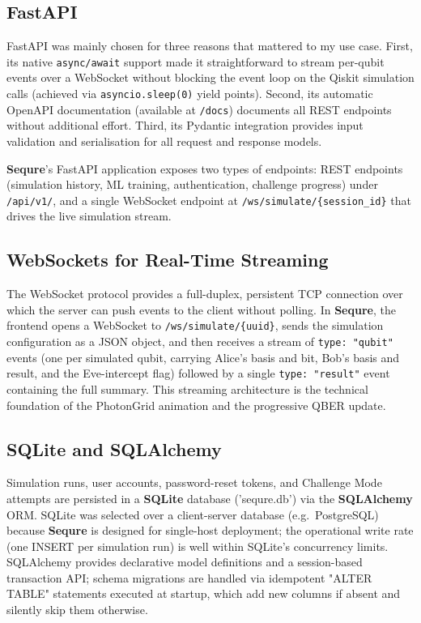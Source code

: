 \documentclass[12pt, a4paper]{article}
\begin{document}
\subsection{FastAPI}
\label{sec:fastapi}

FastAPI was mainly chosen for three reasons that mattered to my use case. First, its native \texttt{async/await} support made it
straightforward to stream per-qubit events over a WebSocket without
blocking the event loop on the Qiskit simulation calls (achieved via
\texttt{asyncio.sleep(0)} yield points). Second, its automatic
OpenAPI documentation (available at \texttt{/docs}) documents all
REST endpoints without additional effort. Third, its Pydantic integration
provides input validation and serialisation for all request and response
models.

\textbf{Sequre}'s FastAPI application exposes two types of endpoints: REST
endpoints (simulation history, ML training, authentication, challenge
progress) under \texttt{/api/v1/}, and a single WebSocket endpoint at
\texttt{/ws/simulate/\{session\_id\}} that drives the live simulation
stream.

\subsection{WebSockets for Real-Time Streaming}
\label{sec:websockets}

The WebSocket protocol provides a full-duplex, persistent TCP connection
over which the server can push events to the client without polling. In
\textbf{Sequre}, the frontend opens a WebSocket to
\texttt{/ws/simulate/\{uuid\}}, sends the simulation configuration as a
JSON object, and then receives a stream of \texttt{type: "qubit"} events
(one per simulated qubit, carrying Alice's basis and bit, Bob's basis
and result, and the Eve-intercept flag) followed by a single
\texttt{type: "result"} event containing the full summary. This streaming
architecture is the technical foundation of the PhotonGrid animation and
the progressive QBER update.

\subsection{SQLite and SQLAlchemy}
\label{sec:sqlite}

Simulation runs, user accounts, password-reset tokens, and Challenge Mode
attempts are persisted in a \textbf{SQLite} database
('sequre.db') via the \textbf{SQLAlchemy} ORM. SQLite was selected
over a client-server database (e.g.\ PostgreSQL) because \textbf{Sequre} is
designed for single-host deployment; the operational write rate (one
INSERT per simulation run) is well within SQLite's concurrency limits.
SQLAlchemy provides declarative model definitions and a session-based
transaction API; schema migrations are handled via idempotent
"ALTER TABLE" statements executed at startup, which add new
columns if absent and silently skip them otherwise.
\end{document}
